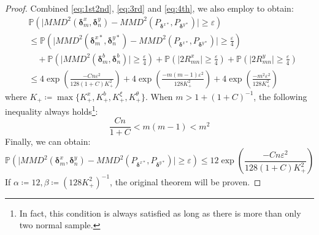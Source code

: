 \documentclass{article}
\begin{document}
\begin{proof}
Combined \eqref{eq:1st2nd}, \eqref{eq:3rd} and \eqref{eq:4th}, we also employ  to obtain:
\begin{equation}
    \begin{aligned}
        & \mathbb{P}\left(\big| MMD^2(\bm{\delta}_m^x, \bm{\delta}_n^y) - MMD^2(P_{\bm{\delta}^{x*}}, P_{\bm{\delta}^{y*}}) \big| \geq \varepsilon \right) \\
        & \leq \mathbb{P}\left(\big|MMD^2(\bm{\delta}_m^{x*}, \bm{\delta}_n^{y*}) - MMD^2(P_{\bm{\delta}^{x*}}, P_{\bm{\delta}^{y*}}) \big| \geq \frac{\varepsilon}{4} \right) \\
        & \quad + \mathbb{P}\left(\big|MMD^2(\bm{\delta}_m^{b}, \bm{\delta}_n^{b})\big| \geq \frac{\varepsilon}{4} \right) + \mathbb{P}(\big|2R_{mn}^x\big| \geq \frac{\varepsilon}{4}) + \mathbb{P}(\big|2R_{mn}^y\big| \geq \frac{\varepsilon}{4}) \\
        & \leq 4\exp\left(\frac{-Cn\varepsilon^2}{128(1+C)K_+^2}\right) + 4\exp\left(\frac{-m(m-1)\varepsilon^2}{128K_+^2}\right) + 4\exp\left(\frac{-m^2\varepsilon^2}{128K_+^2}\right)
    \end{aligned}
\end{equation}
where $K_+ \coloneqq \max\{K_+^x, K_+^b, K_+^\xi, K_+^\theta\}$.
When $m > 1 + (1+C)^{-1}$, the following inequality always holds\footnote{In fact, this condition is always satisfied as long as there is more than only two normal sample.}:
\begin{equation}
    \frac{Cn}{1+C} < m(m-1) < m^2
\end{equation}
Finally, we can obtain:
\begin{equation}
    \mathbb{P}\left(\big| MMD^2(\bm{\delta}_m^x, \bm{\delta}_n^y) - MMD^2(P_{\bm{\delta}^{x*}}, P_{\bm{\delta}^{y*}}) \big| \geq \varepsilon \right) \leq 12\exp\left(\frac{-Cn\varepsilon^2}{128(1+C)K_+^2}\right)
\end{equation}
If $\alpha\coloneqq12, \beta\coloneqq(128K_+^2)^{-1}$, the original theorem will be proven.
\end{proof}
\end{document}
